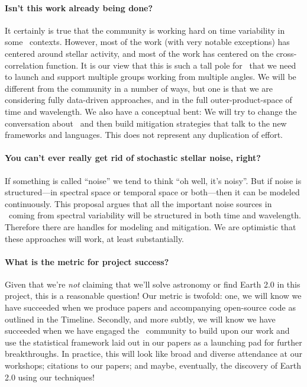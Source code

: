 \documentclass[12pt, letterpaper]{article}
\begin{document}
\paragraph{Isn't this work already being done?}
It certainly is true that the community is working hard on time
variability in some \EPRV\ contexts.
However, most of the work (with very notable exceptions) has centered
around stellar activity, and most of the work has centered on the
cross-correlation function.
It is our view that this is such a tall pole for \EPRV\ that we need
to launch and support multiple groups working from multiple angles.
We will be different from the community in a number of ways, but one
is that we are considering fully data-driven approaches, and in the
full outer-product-space of time and wavelength.
We also have a conceptual bent: We will try to change the conversation
about \EPRV\ and then build mitigation strategies that talk to the
new frameworks and languages.
This does not represent any duplication of effort.

\paragraph{You can't ever really get rid of stochastic stellar noise, right?}
If something is called ``noise'' we tend to think ``oh well, it's
noisy''. But if noise is structured---in spectral space or temporal
space or both---then it can be modeled continuously.
This proposal argues that all the important noise sources in \EPRV\ coming
from spectral variability will be structured in both time and wavelength.
Therefore there are handles for modeling and mitigation.
We are optimistic that these approaches will work, at least substantially.

\paragraph{What is the metric for project success?}
Given that we're \textit{not} claiming that we'll 
solve astronomy or find Earth 2.0 in this project, this is a reasonable 
question! Our metric is twofold: one, we will know we have succeeded when we 
produce papers and accompanying open-source code as outlined in the Timeline. 
Secondly, and more subtly, we will know we have succeeded when we have engaged 
the \EPRV\ community to build upon our work and use the statistical framework 
laid out in our papers as a launching pad for further breakthroughs. 
In practice, this will look like broad and diverse attendance at our workshops; 
citations to our papers; and maybe, eventually, the discovery of Earth 2.0
using our techniques!

\clearpage

\raggedright
\end{document}
